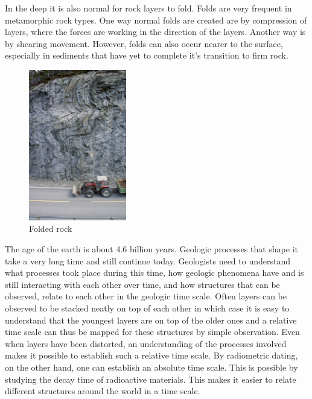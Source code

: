 \documentclass[a4paper,12pt]{report}
\begin{document}
In the deep it is also normal for rock layers to fold. Folds are very frequent in metamorphic rock types. One way normal folds are created are by compression of layers, where the forces are working in the direction of the layers. Another way is by shearing movement. However, folds can also occur nearer to the surface, especially in sediments that have yet to complete it's transition to firm rock.

\begin{figure}
  \begin{center}
    \includegraphics[width=0.38\textwidth]{thesis/geo/fold.png}
  \end{center}
  \caption{Folded rock}
  \label{fig:fold}
  
\end{figure}

The age of the earth is about 4.6 billion years. Geologic processes that shape it take a very long time and still continue today. Geologists need to understand what processes took place during this time, how geologic phenomena have and is still interacting with each other over time, and how structures that can be observed, relate to each other in the geologic time scale. Often layers can be observed to be stacked neatly on top of each other in which case it is easy to understand that the youngest layers are on top of the older ones and a relative time scale can thus be mapped for these structures by simple observation. Even when layers have been distorted, an understanding of the processes involved makes it possible to establish such a relative time scale. By radiometric dating, on the other hand, one can establish an absolute time scale. This is possible by studying the decay time of radioactive materials. This makes it easier to relate different structures around the world in a time scale.
\end{document}
